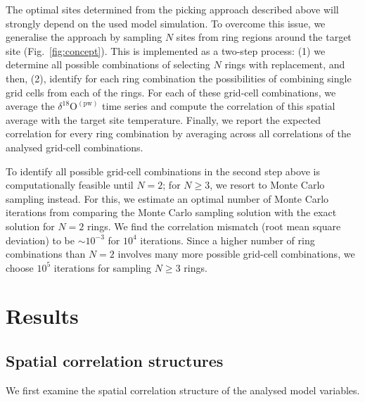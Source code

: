 \documentclass[cp, manuscript]{copernicus}
\begin{document}
The optimal sites determined from the picking approach described above will
strongly depend on the used model simulation. To overcome this issue, we
generalise the approach by sampling $N$ sites from ring regions around the
target site (Fig.~\ref{fig:concept}).  This is implemented as a two-step
process: (1) we determine all possible combinations of selecting $N$ rings with
replacement, and then, (2), identify for each ring combination the possibilities
of combining single grid cells from each of the rings. For each of these
grid-cell combinations, we average the $\delta^{18}\mathrm{O}^{\mathrm{(pw)}}$
time series and compute the correlation of this spatial average with the target
site temperature. Finally, we report the expected correlation for every ring
combination by averaging across all correlations of the analysed grid-cell
combinations.

To identify all possible grid-cell combinations in the second step above is
computationally feasible until $N=2$; for $N\geq3$, we resort to Monte Carlo
sampling instead. For this, we estimate an optimal number of Monte Carlo
iterations from comparing the Monte Carlo sampling solution with the exact
solution for $N=2$ rings. We find the correlation mismatch (root mean
square deviation) to be $\sim10^{-3}$ for $10^4$ iterations. Since a higher
number of ring combinations than $N=2$ involves many more possible grid-cell
combinations, we choose $10^5$ iterations for sampling $N\geq3$ rings.

\section{Results}\label{results}

\subsection{Spatial correlation structures}\label{results:cor.struct}

We first examine the spatial correlation structure of the analysed model
variables.
\end{document}
